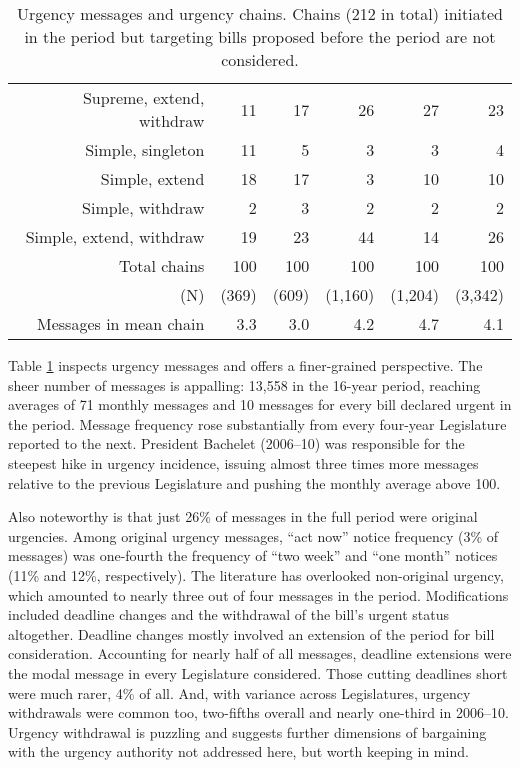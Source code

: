 \documentclass[letter,12pt]{article}
\begin{document}
\begin{table}
\begin{tabular}{rrrrr|r}
Supreme, extend, withdraw   & 11 & 17 & 26 & 27 &  23  \\ \hdashline
Simple, singleton           & 11 & 5  & 3  & 3  &   4  \\
Simple, extend              & 18 & 17 & 3  & 10 &  10  \\
Simple, withdraw            & 2  & 3  & 2  & 2  &   2  \\
Simple, extend, withdraw    & 19 & 23 & 44 & 14 &  26  \\ \hline
Total chains                & 100 & 100 & 100 & 100 & 100  \\
(N)                         & (369) & (609) & (1,160) & (1,204) &(3,342) \\ 
Messages in mean chain      & 3.3   & 3.0   & 4.2     & 4.7     & 4.1 \\ \hline
\end{tabular}
\caption{Urgency messages and urgency chains. Chains (212 in total) initiated in the period but targeting bills proposed before the period are not considered.}\label{t:freqUrg}
\end{table}

Table \ref{t:freqUrg} inspects urgency messages and offers a finer-grained perspective. The sheer number of messages is appalling: 13,558 in the 16-year period, reaching averages of 71 monthly messages and 10 messages for every bill declared urgent in the period. Message frequency rose substantially from every four-year Legislature reported to the next. President Bachelet (2006--10) was responsible for the steepest hike in urgency incidence, issuing almost three times more messages relative to the previous Legislature and pushing the monthly average above 100. 

Also noteworthy is that just 26\% of messages in the full period were original urgencies. Among original urgency messages, ``act now'' notice frequency (3\% of messages) was one-fourth the frequency of ``two week'' and ``one month'' notices (11\% and 12\%, respectively). The literature has overlooked non-original urgency, which amounted to nearly three out of four messages in the period. Modifications included deadline changes and the withdrawal of the bill's urgent status altogether. Deadline changes mostly involved an extension of the period for bill consideration. Accounting for nearly half of all messages, deadline extensions were the modal message in every Legislature considered. Those cutting deadlines short were much rarer, 4\% of all. And, with variance across Legislatures, urgency withdrawals were common too, two-fifths overall and nearly one-third in 2006--10. Urgency withdrawal is puzzling and suggests further dimensions of bargaining with the urgency authority not addressed here, but worth keeping in mind. 
\end{document}
